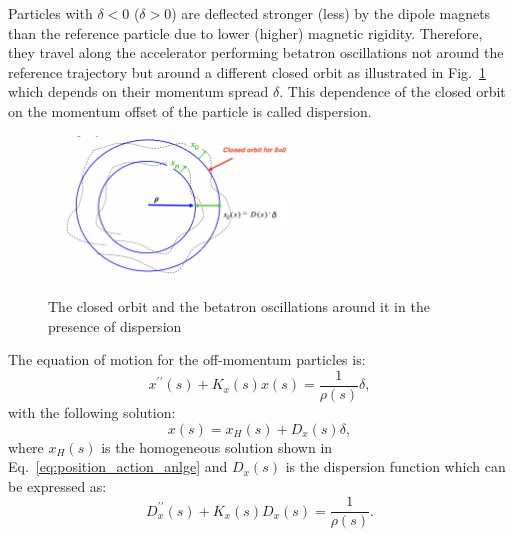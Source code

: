 Particles with $\delta < 0$ ($\delta>0$) are deflected stronger (less) by the dipole magnets than the reference particle due to lower (higher) magnetic rigidity. Therefore, they travel along the accelerator performing betatron oscillations not around the reference trajectory but around a different closed orbit as illustrated in Fig.~\ref{fig:closed_orbit_Dx} which depends on their momentum spread $\delta$. This dependence of the closed orbit on the momentum offset of the particle is called dispersion.

\begin{figure}[!h] %
    \centering         
    \includegraphics[width=0.6\textwidth]{images/Ch2/closed_orbit_dispersion.png}
        \caption{The closed orbit and the betatron oscillations around it in the presence of dispersion~\cite{Holzer_summer_students_introduction}}
        \label{fig:closed_orbit_Dx}
 \end{figure}

The equation of motion for the off-momentum particles is:
\begin{equation}
    x^{\prime \prime}(s) + K_x(s)x(s) = \frac{1}{\rho(s)} \delta,
\end{equation}
with the following solution:
\begin{equation}
    x(s) = x_H(s) + D_x(s)\delta,
\end{equation}
where $x_H(s)$ is the homogeneous solution shown in Eq.~\eqref{eq:position_action_anlge} and $D_x(s)$ is the dispersion function which can be expressed as:
\begin{equation}\label{eq:dispersion_function}
    D^{\prime \prime}_x(s) + K_x(s)D_x(s) = \frac{1}{\rho(s)}.
\end{equation}


